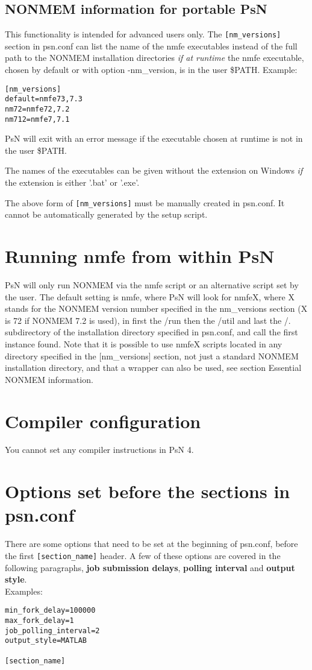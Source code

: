 \subsection{NONMEM information for portable PsN}
This functionality is intended for advanced users only. The
\verb|[nm_versions]|
section in psn.conf can list the name of the nmfe executables instead of the full path to the NONMEM installation directories \emph{if at runtime} the nmfe executable, chosen by default or with option -nm\_version, is in the user \$PATH. Example:
\begin{verbatim}
[nm_versions]
default=nmfe73,7.3
nm72=nmfe72,7.2
nm712=nmfe7,7.1
\end{verbatim}
PsN will exit with an error message if the executable chosen at runtime is not in the user \$PATH.

The names of the executables can be given without the extension on Windows \emph{if} the extension is either '.bat' or '.exe'. 

The above form of \verb|[nm_versions]| must be manually created in psn.conf. It cannot be automatically generated by the setup script.

\section{Running nmfe from within PsN}

PsN will only run NONMEM via the nmfe script or an alternative script set by the user. 
The default setting is nmfe, where PsN will look for nmfeX, where X stands for the NONMEM version number specified in the nm\_versions section (X is 72 if NONMEM 7.2 is used), in first the /run then the /util and last the /. subdirectory of the installation directory specified in psn.conf, and call the first instance found. Note that it is possible to use nmfeX scripts located in any directory specified in the [nm\_versions] section, not just a standard NONMEM installation directory, and that a wrapper can also be used, see section Essential NONMEM information.

\section{Compiler configuration}

You cannot set any compiler instructions in PsN 4.
\section{Options set before the sections in psn.conf}
There are some options that need to be set at the beginning of psn.conf, before the first \verb|[section_name]| header. A few of these options are covered in the following paragraphs, \textbf{job submission delays}, \textbf{polling interval} and \textbf{output style}.\\
Examples:
\begin{verbatim}
min_fork_delay=100000
max_fork_delay=1
job_polling_interval=2
output_style=MATLAB

[section_name]
\end{verbatim}


